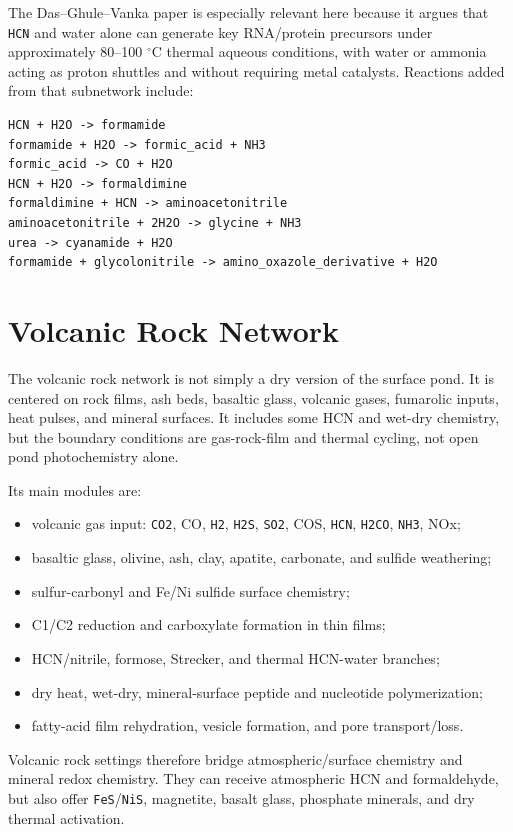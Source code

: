 \documentclass[11pt]{article}
\newcommand{\ch}[1]{\mbox{\texttt{#1}}}
\begin{document}
The Das--Ghule--Vanka paper is especially relevant here because it argues that
\ch{HCN} and water alone can generate key RNA/protein precursors under
approximately 80--100 \(^\circ\)C thermal aqueous conditions, with water or
ammonia acting as proton shuttles and without requiring metal catalysts.
Reactions added from that subnetwork include:
\begin{verbatim}
HCN + H2O -> formamide
formamide + H2O -> formic_acid + NH3
formic_acid -> CO + H2O
HCN + H2O -> formaldimine
formaldimine + HCN -> aminoacetonitrile
aminoacetonitrile + 2H2O -> glycine + NH3
urea -> cyanamide + H2O
formamide + glycolonitrile -> amino_oxazole_derivative + H2O
\end{verbatim}

\section{Volcanic Rock Network}

The volcanic rock network is not simply a dry version of the surface pond.  It
is centered on rock films, ash beds, basaltic glass, volcanic gases, fumarolic
inputs, heat pulses, and mineral surfaces.  It includes some HCN and wet-dry
chemistry, but the boundary conditions are gas-rock-film and thermal cycling,
not open pond photochemistry alone.

Its main modules are:
\begin{itemize}
\item volcanic gas input: \ch{CO2}, CO, \ch{H2}, \ch{H2S}, \ch{SO2}, COS,
\ch{HCN}, \ch{H2CO}, \ch{NH3}, NOx;
\item basaltic glass, olivine, ash, clay, apatite, carbonate, and sulfide
weathering;
\item sulfur-carbonyl and Fe/Ni sulfide surface chemistry;
\item C1/C2 reduction and carboxylate formation in thin films;
\item HCN/nitrile, formose, Strecker, and thermal HCN-water branches;
\item dry heat, wet-dry, mineral-surface peptide and nucleotide polymerization;
\item fatty-acid film rehydration, vesicle formation, and pore transport/loss.
\end{itemize}

Volcanic rock settings therefore bridge atmospheric/surface chemistry and
mineral redox chemistry.  They can receive atmospheric HCN and formaldehyde,
but also offer \ch{FeS}/\ch{NiS}, magnetite, basalt glass, phosphate minerals,
and dry thermal activation.
\end{document}
